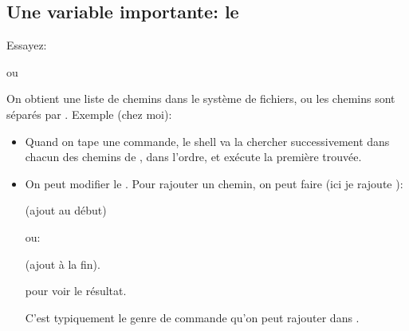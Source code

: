 \subsection*{Une variable importante: le }\label{path}
Essayez:


ou


On obtient une liste de chemins dans le système de fichiers, ou les
chemins sont séparés par \ttt{:}. Exemple (chez moi):

  
\noindent{}\newline {}

\begin{itemize}
\item Quand on tape une commande, le shell va la chercher
  successivement dans chacun des chemins de , dans l'ordre,
  et exécute la première trouvée.

\item On peut modifier le . Pour rajouter un chemin, on peut
  faire (ici je rajoute ):

   (ajout au début)

  ou:

   (ajout à la fin).

   pour voir le résultat.

  C'est typiquement le genre de commande qu'on peut rajouter dans
  . 
\end{itemize}
